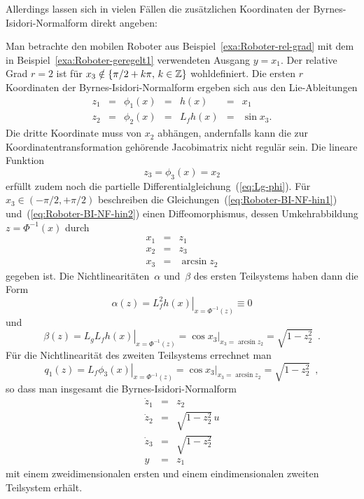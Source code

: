 Allerdings lassen sich in vielen Fällen die zusätzlichen Koordinaten
der Byrnes-Isidori-Normalform direkt angeben:

\begin{example}
\label{exa:Roboter-BI-NF}Man betrachte den mobilen Roboter aus Beispiel~\ref{exa:Roboter-rel-grad}
mit dem in Beispiel~\ref{exa:Roboter-geregelt1} verwendeten Ausgang
$y=x_{1}$. Der relative Grad $r=2$ ist für $x_{3}\notin\{\pi/2+k\pi,\,k\in{\mathbb{Z}}\}$
wohldefiniert. Die ersten $r$ Koordinaten der Byrnes-Isidori-Normalform
ergeben sich aus den Lie-Ableitungen
\begin{equation}
\begin{array}{lclcccl}
z_{1} & = & \phi_{1}(x) & = & h(x) & = & x_{1}\\
z_{2} & = & \phi_{2}(x) & = & L_{f}h(x) & = & \sin x_{3}.
\end{array}\label{eq:Roboter-BI-NF-hin1}
\end{equation}
Die dritte Koordinate muss von $x_{2}$ abhängen, andernfalls kann
die zur Koordinatentransformation gehörende Jacobimatrix nicht regulär
sein. Die lineare Funktion 
\begin{equation}
z_{3}=\phi_{3}(x)=x_{2}\label{eq:Roboter-BI-NF-hin2}
\end{equation}
erfüllt zudem noch die partielle Differentialgleichung~(\ref{eq:Lg-phi}).
Für $x_{3}\in(-\pi/2,+\pi/2)$ beschreiben die Gleichungen~(\ref{eq:Roboter-BI-NF-hin1})
und~(\ref{eq:Roboter-BI-NF-hin2}) einen Diffeomorphismus, dessen
Umkehrabbildung $z=\Phi^{-1}(x)$ durch 
\[
\begin{array}{lcl}
x_{1} & = & z_{1}\\
x_{2} & = & z_{3}\\
x_{3} & = & \arcsin z_{2}
\end{array}
\]
gegeben ist. Die Nichtlinearitäten~$\alpha$ und~$\beta$ des ersten
Teilsystems haben dann die Form 
\[
\alpha(z)=\left.L_{f}^{2}h(x)\right|_{x=\Phi^{-1}(z)}\equiv0
\]
und
\[
\beta(z)=\left.L_{g}L_{f}h(x)\right|_{x=\Phi^{-1}(z)}=\left.\cos x_{3}\right|_{x_{3}=\arcsin z_{2}}=\sqrt{1-z_{2}^{2}}\enspace.
\]
Für die Nichtlinearität des zweiten Teilsystems errechnet man 
\[
q_{1}(z)=\left.L_{f}\phi_{3}(x)\right|_{x=\Phi^{-1}(z)}=\left.\cos x_{3}\right|_{x_{3}=\arcsin z_{2}}=\sqrt{1-z_{2}^{2}}\enspace,
\]
so dass man insgesamt die Byrnes-Isidori-Normalform
\begin{equation}
\begin{array}{lcl}
\dot{z}_{1} & = & z_{2}\\
\dot{z}_{2} & = & \sqrt{1-z_{2}^{2}}\,u\\
\dot{z}_{3} & = & \sqrt{1-z_{2}^{2}}\\
y & = & z_{1}
\end{array}\label{eq:Roboter-BI-NF}
\end{equation}
mit einem zweidimensionalen ersten und einem eindimensionalen zweiten
Teilsystem erhält.
\end{example}

